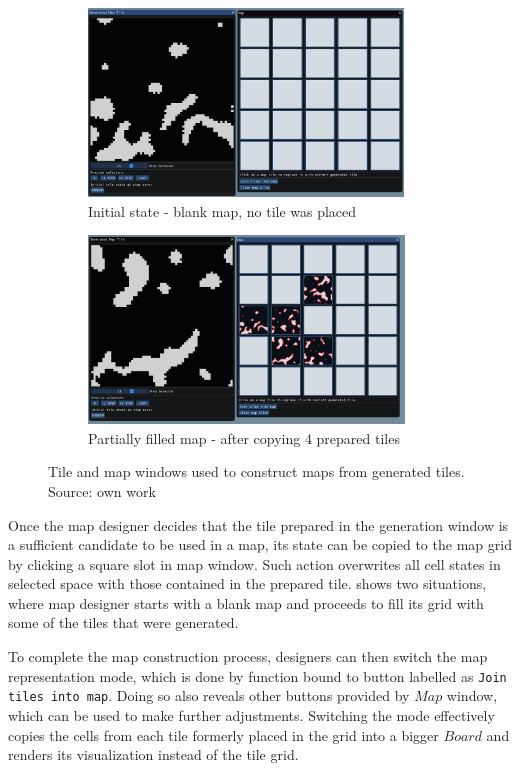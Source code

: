 \documentclass[12pt]{report}
\begin{document}
\begin{figure}[h]
	\centering
	\begin{subfigure}[t]{0.9\textwidth}
		\centering
		\includegraphics[height=5cm]{images/mapnotiles}
		\caption{Initial state - blank map, no tile was placed} 
	\end{subfigure}  
	\begin{subfigure}[t]{0.9\textwidth}
		\centering
		\includegraphics[height=5cm]{images/map4tiles}
		\caption{Partially filled map - after copying 4 prepared tiles} 
	\end{subfigure} 
	\caption{Tile and map windows used to construct maps from generated tiles. Source: own work}
	\label{fig:map_merging}
\end{figure}

Once the map designer decides that the tile prepared in the generation window is a sufficient candidate to be used in a map, its state can be copied to the map grid by clicking a square slot in map window. Such action overwrites all cell states in selected space with those contained in the prepared tile.  shows two situations, where map designer starts with a blank map and proceeds to fill its grid with some of the tiles that were generated.

To complete the map construction process, designers can then switch the map representation mode, which is done by function bound to button labelled as \texttt{Join tiles into map}. Doing so also reveals other buttons provided by $Map$ window, which can be used to make further adjustments. Switching the mode effectively copies the cells from each tile formerly placed in the grid into a bigger $Board$ and renders its visualization instead of the tile grid.
\end{document}
